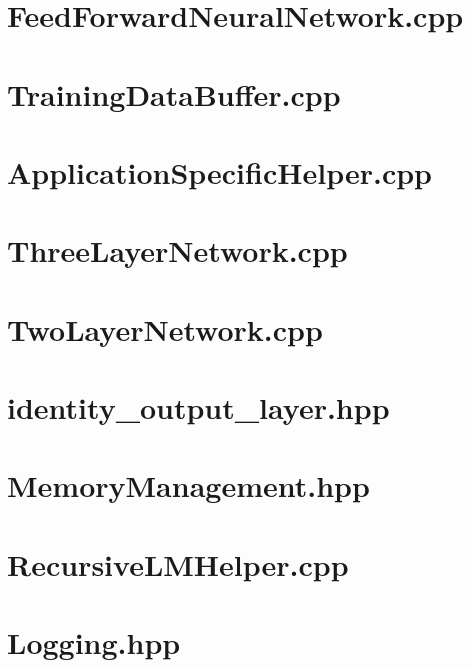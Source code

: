 \section{FeedForwardNeuralNetwork.cpp} \label{app:CppCode:ffnn}

\clearpage
\section{TrainingDataBuffer.cpp} \label{app:CppCode:trainData}

\clearpage
\section{ApplicationSpecificHelper.cpp} \label{app:CppCode:appSpecObj}

\clearpage
\section{ThreeLayerNetwork.cpp} \label{app:CppCode:threeLayer}

\clearpage
\section{TwoLayerNetwork.cpp} \label{app:CppCode:twoLayer}

\clearpage
\section{identity\_output\_layer.hpp} \label{app:CppCode:identityOutput}

\clearpage
\section{MemoryManagement.hpp} \label{app:CppCode:memManage}

\clearpage
\section{RecursiveLMHelper.cpp} \label{app:CppCode:rlmHelper}

\clearpage
\section{Logging.hpp} \label{app:CppCode:loggingh}

\clearpage
